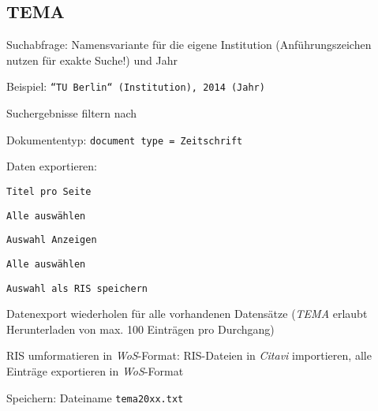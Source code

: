 \subsection*{TEMA}
\begin{compactitem}
\item Suchabfrage: Namensvariante für die eigene Institution (Anführungszeichen nutzen für exakte Suche!) und Jahr
	\begin{compactitem}
    \item Beispiel: \texttt{``TU Berlin`` (Institution), 2014 (Jahr)}
    \end{compactitem}
\item Suchergebnisse filtern nach
	\begin{compactitem}
    \item Dokumententyp: \texttt{document type = Zeitschrift}
    \end{compactitem}
\item Daten exportieren: 
	\begin{compactitem}
    \item \texttt{Titel pro Seite}
	\item \texttt{Alle auswählen}
    \item \texttt{Auswahl Anzeigen}
    \item \texttt{Alle auswählen}
    \item \texttt{Auswahl als RIS speichern}
    \end{compactitem}
\item Datenexport wiederholen für alle vorhandenen Datensätze (\textit{TEMA} erlaubt Herunterladen von max. 100 Einträgen pro Durchgang)
\item RIS umformatieren in \textit{WoS}-Format: RIS-Dateien in \textit{Citavi} importieren, alle Einträge exportieren in \textit{WoS}-Format
\item Speichern: Dateiname \texttt{tema20xx.txt}
\end{compactitem}

